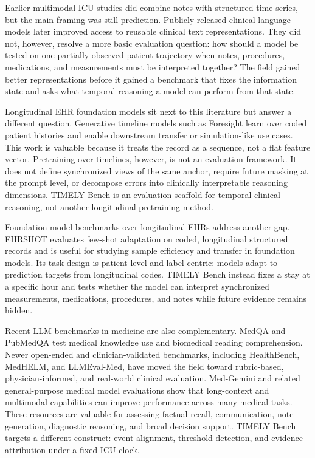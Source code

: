 \documentclass[pdflatex,sn-nature]{sn-jnl}
\begin{document}
Earlier multimodal ICU studies did combine notes with structured time series, but the main framing was still prediction\cite{khadanga2019using}. Publicly released clinical language models later improved access to reusable clinical text representations\cite{alsentzer2019clinicalbert}. They did not, however, resolve a more basic evaluation question: how should a model be tested on one partially observed patient trajectory when notes, procedures, medications, and measurements must be interpreted together? The field gained better representations before it gained a benchmark that fixes the information state and asks what temporal reasoning a model can perform from that state.

Longitudinal EHR foundation models sit next to this literature but answer a different question. Generative timeline models such as Foresight learn over coded patient histories and enable downstream transfer or simulation-like use cases\cite{kraljevic2024foresight}. This work is valuable because it treats the record as a sequence, not a flat feature vector. Pretraining over timelines, however, is not an evaluation framework. It does not define synchronized views of the same anchor, require future masking at the prompt level, or decompose errors into clinically interpretable reasoning dimensions. TIMELY Bench is an evaluation scaffold for temporal clinical reasoning, not another longitudinal pretraining method.

Foundation-model benchmarks over longitudinal EHRs address another gap. EHRSHOT evaluates few-shot adaptation on coded, longitudinal structured records and is useful for studying sample efficiency and transfer in foundation models\cite{wornow2023ehrshot}. Its task design is patient-level and label-centric: models adapt to prediction targets from longitudinal codes. TIMELY Bench instead fixes a stay at a specific hour and tests whether the model can interpret synchronized measurements, medications, procedures, and notes while future evidence remains hidden.

Recent LLM benchmarks in medicine are also complementary. MedQA and PubMedQA test medical knowledge use and biomedical reading comprehension\cite{jin2021medqa,jin2019pubmedqa}. Newer open-ended and clinician-validated benchmarks, including HealthBench, MedHELM, and LLMEval-Med, have moved the field toward rubric-based, physician-informed, and real-world clinical evaluation\cite{arora2025healthbench,bedi2025medhelm,zhang2025llmevalmed}. Med-Gemini and related general-purpose medical model evaluations show that long-context and multimodal capabilities can improve performance across many medical tasks\cite{saab2024gemini}. These resources are valuable for assessing factual recall, communication, note generation, diagnostic reasoning, and broad decision support. TIMELY Bench targets a different construct: event alignment, threshold detection, and evidence attribution under a fixed ICU clock.
\end{document}
